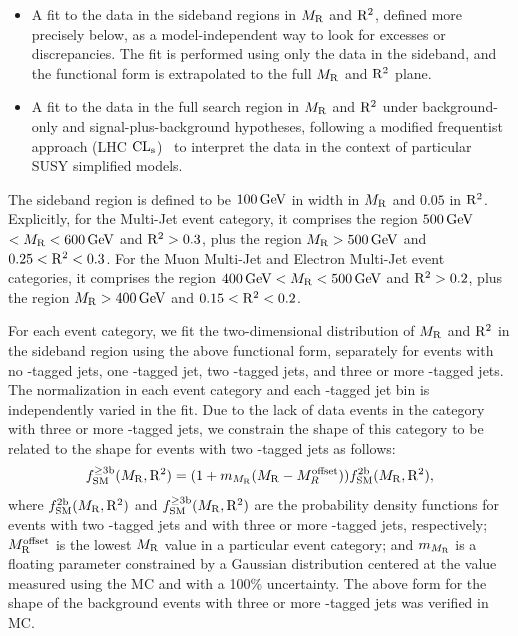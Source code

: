 \begin{itemize}
  \item A fit to the data in the sideband regions in $M_\mathrm{R}$ and 
    $\mathrm{R}^2$, defined more precisely below, as a model-independent way to look for excesses or 
    discrepancies. The fit is performed using only the data in the 
    sideband, and the functional form is extrapolated to the full $M_\mathrm{R}$ and $\mathrm{R}^2$ plane.
  \item A fit to the data in the full search region in $M_\mathrm{R}$ and $\mathrm{R}^2$ under  
    background-only and signal-plus-background hypotheses, following 
    a modified frequentist approach (LHC $\mathrm{CL}_\mathrm{s}$)~\cite{bib-cls,Read:2000ru,Cowan:2010js,LHCCLs} 
    to interpret the data in the context of particular SUSY simplified models. 
\end{itemize}

The sideband region is defined to be $100 \,\text{Ge\hspace{-.08em}V}$ in width in $M_\mathrm{R}$
and $0.05$ in $\mathrm{R}^2$. Explicitly, for the
Multi-Jet event category, it comprises the region $500 \,\text{Ge\hspace{-.08em}V}$
$< M_\mathrm{R} < 600 \,\text{Ge\hspace{-.08em}V}$ and $\mathrm{R}^2 > 0.3$, plus the region $M_\mathrm{R} > 500 \,\text{Ge\hspace{-.08em}V}$
and $0.25 < \mathrm{R}^2 < 0.3$.  For the Muon Multi-Jet and Electron Multi-Jet
event categories, it comprises the region $400 \,\text{Ge\hspace{-.08em}V} < M_\mathrm{R} < 500 \,\text{Ge\hspace{-.08em}V}$
and $\mathrm{R}^2 > 0.2$, plus the region $M_\mathrm{R} > 400 \,\text{Ge\hspace{-.08em}V}$ and
$0.15 < \mathrm{R}^2 < 0.2$. 

For each event category, we fit the two-dimensional distribution of 
$M_\mathrm{R}$ and $\mathrm{R}^2$ in the sideband region using the
above functional form, separately for events with no \PQb-tagged jets, one
\PQb-tagged jet, two \PQb-tagged jets, and three or more \PQb-tagged jets. The
normalization in each event category and each \PQb-tagged jet bin is
independently varied in the fit. Due to the lack of data events in the category
with three or more \PQb-tagged jets, we constrain
the shape of this category to be related to the shape for events with two
\PQb-tagged jets as follows:
\begin{equation}
  f^{\geq 3\mathrm{b}}_{\mathrm{SM}}(M_\mathrm{R}, \mathrm{R}^2)  = (1+m_{M_\mathrm{R}}(M_\mathrm{R} - M^{\mathrm{offset}}_R))f^{2\mathrm{b}}_{\mathrm{SM}}(M_\mathrm{R}, \mathrm{R}^2),
\label{eq:3btagFunction}
\end{equation}
where $f^{2\mathrm{b}}_{\mathrm{SM}}(M_\mathrm{R}, \mathrm{R}^2)$ and $f^{\geq 3\mathrm{b}}_{\mathrm{SM}}(M_\mathrm{R}, \mathrm{R}^2)$ are the
probability density functions for events with
two \PQb-tagged jets and with three or more \PQb-tagged jets,
respectively; $M_\mathrm{R}^{\mathrm{offset}}$ is the lowest $M_\mathrm{R}$ value in a particular
event category; and $m_{M_\mathrm{R}}$ is a floating parameter constrained by a Gaussian distribution
centered at the value measured using the MC and with a
100\% uncertainty. The above form for the shape of the background events 
with three or more \PQb-tagged jets was verified in MC.

